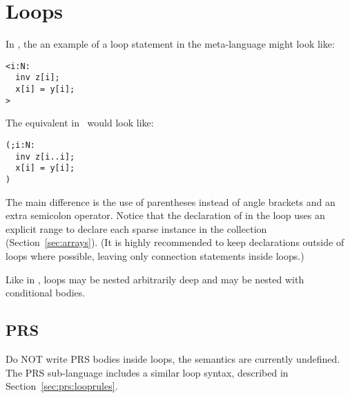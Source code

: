 
\section{Loops}
\label{sec:loops}

In \CAST, the an example of a loop statement in the meta-language
might look like:

\begin{verbatim}
<i:N:
  inv z[i];
  x[i] = y[i];
>
\end{verbatim}

The equivalent in \hac\ would look like:

\begin{verbatim}
(;i:N:
  inv z[i..i];
  x[i] = y[i];
)
\end{verbatim}

The main difference is the use of parentheses instead of 
angle brackets and an extra semicolon operator.  
Notice that the declaration of  in the loop uses
an explicit range to declare each sparse instance 
in the collection (Section~\ref{sec:arrays}).  
(It is highly recommended to keep declarations outside of 
loops where possible, leaving only connection statements inside loops.)

Like in \CAST, loops may be nested arbitrarily deep and
may be nested with conditional bodies.  

\subsection{PRS}
\label{sec:loops:prs}

Do NOT write PRS bodies inside loops, the semantics are currently
undefined.  The PRS sub-language includes a similar loop syntax, 
described in Section~\ref{sec:prs:looprules}.  

